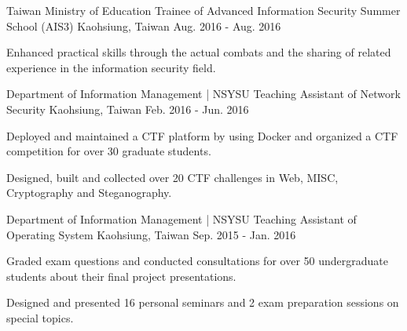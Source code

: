 \begin{cventries}

\cventry
{Taiwan Ministry of Education} %
{Trainee of Advanced Information Security Summer School (AIS3)} %
{Kaohsiung, Taiwan} %
{Aug. 2016 - Aug. 2016} %
{ %
\begin{cvitems}
\item {Enhanced practical skills through the actual combats and the sharing of related experience in the information security field.}
\end{cvitems}
}


\cventry
{Department of Information Management | NSYSU} %
{Teaching Assistant of Network Security} %
{Kaohsiung, Taiwan} %
{Feb. 2016 - Jun. 2016} %
{ %
\begin{cvitems}
\item {Deployed and maintained a CTF platform by using Docker and organized a CTF competition for over 30 graduate students.}
\item {Designed, built and collected over 20 CTF challenges in Web, MISC, Cryptography and Steganography.}
\end{cvitems}
}


\cventry
{Department of Information Management | NSYSU} %
{Teaching Assistant of Operating System} %
{Kaohsiung, Taiwan} %
{Sep. 2015 - Jan. 2016} %
{ %
\begin{cvitems}
\item {Graded exam questions and conducted consultations for over 50 undergraduate students about their final project presentations.}
\item {Designed and presented 16 personal seminars and 2 exam preparation sessions on special topics.}
\end{cvitems}
}

\end{cventries}
